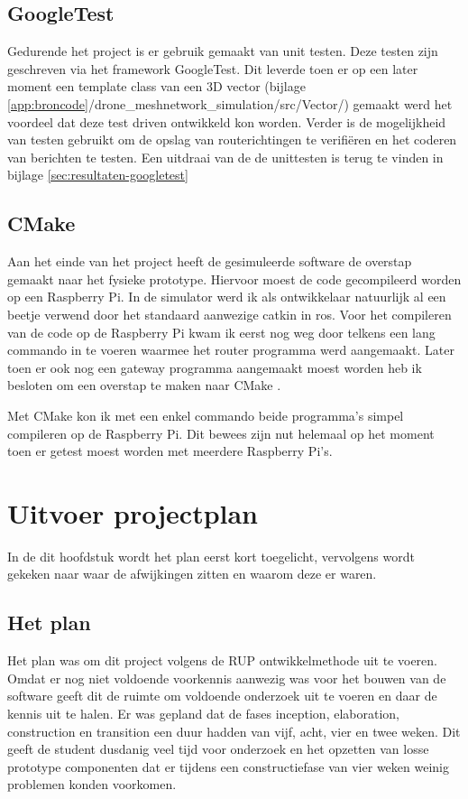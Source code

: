 \documentclass[a4paper, 11pt, oneside]{report}
\begin{document}
\section{GoogleTest}

Gedurende het project is er gebruik gemaakt van unit testen. 
Deze testen zijn geschreven via het framework GoogleTest.
Dit leverde toen er op een later moment een template class van een 3D vector (bijlage \ref{app:broncode}/drone\_meshnetwork\_simulation/src/Vector/) gemaakt werd het voordeel dat deze test driven ontwikkeld kon worden.  
Verder is de mogelijkheid van testen gebruikt om de opslag van routerichtingen te verifiëren en het coderen van berichten te testen.
Een uitdraai van de de unittesten is terug te vinden in bijlage \ref{sec:resultaten-googletest}

\section{CMake}
Aan het einde van het project heeft de gesimuleerde software de overstap gemaakt naar het fysieke prototype. 
Hiervoor moest de code gecompileerd worden op een Raspberry Pi.
In de simulator werd ik als ontwikkelaar natuurlijk al een beetje verwend door het standaard aanwezige catkin  in ros.
Voor het compileren van de code op de Raspberry Pi kwam ik eerst nog weg door telkens een lang commando in te voeren waarmee het router programma werd aangemaakt.
Later toen er ook nog een gateway programma aangemaakt moest worden heb ik besloten om een overstap te maken naar CMake \cite{cmake}.

Met CMake kon ik met een enkel commando beide programma's simpel compileren op de Raspberry Pi.
Dit bewees zijn nut helemaal op het moment toen er getest moest worden met meerdere Raspberry Pi's.

\chapter{Uitvoer projectplan}\label{sec:uitvoer-projectplan}
In de dit hoofdstuk wordt het plan eerst kort toegelicht, vervolgens wordt gekeken naar waar de afwijkingen zitten en waarom deze er waren.



\section{Het plan}\label{sec:het-plan}
Het plan was om dit project volgens de RUP ontwikkelmethode uit te voeren. 
Omdat er nog niet voldoende voorkennis aanwezig was voor het bouwen van de software geeft dit de ruimte om voldoende onderzoek uit te voeren en daar de kennis uit te halen. 
Er was gepland dat de fases inception, elaboration, construction en transition een duur hadden van vijf, acht, vier en twee weken. 
Dit geeft de student dusdanig veel tijd voor onderzoek en het opzetten van losse prototype componenten dat er tijdens een constructiefase van vier weken weinig problemen konden voorkomen. 
\end{document}
